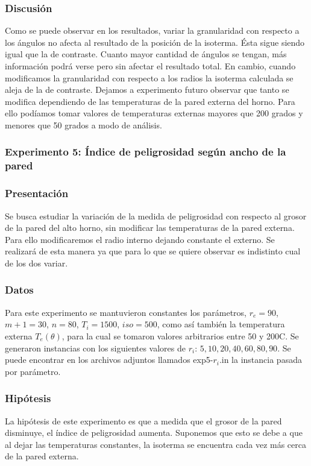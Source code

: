       \subsubsection*{Discusión}
        Como se puede observar en los resultados, variar la granularidad con respecto a los ángulos no afecta al resultado de la posición de la isoterma. Ésta sigue siendo igual que la de contraste. Cuanto mayor cantidad de ángulos se tengan, más información podrá verse pero sin afectar el resultado total. En cambio, cuando modificamos la granularidad con respecto a los radios la isoterma calculada se aleja de la de contraste. Dejamos a experimento futuro observar que tanto se modifica dependiendo de las temperaturas de la pared externa del horno. Para ello podíamos tomar valores de temperaturas externas mayores que 200 grados y menores que 50 grados a modo de análisis.


    \subsubsection*{Experimento 5: Índice de peligrosidad según ancho de la pared}

      \subsubsection*{Presentación}
        Se busca estudiar la variación de la medida de peligrosidad con respecto al grosor de la pared del alto horno, sin modificar las temperaturas de la pared externa. Para ello modificaremos el radio interno dejando constante el externo. Se realizará de esta manera ya que para lo que se quiere observar es indistinto cual de los dos variar. 

      \subsubsection*{Datos}
        Para este experimento se mantuvieron constantes los parámetros, $r_e = 90$, $m+1 = 30$, $n = 80$, $T_i = 1500$, $iso = 500$, como así también la temperatura externa $T_e(\theta)$, para la cual se tomaron valores arbitrarios entre 50 y 200{\degree}C. Se generaron instancias con los siguientes valores de $r_i$: $5, 10, 20, 40, 60, 80, 90$.  Se puede encontrar en los archivos adjuntos llamados exp5-$r_i$.in la instancia pasada por parámetro.
     
      \subsubsection*{Hipótesis}
        La hipótesis de este experimento es que a medida que el grosor de la pared disminuye, el índice de peligrosidad aumenta. Suponemos que esto se debe a que al dejar las temperaturas constantes, la isoterma se encuentra cada vez más cerca de la pared externa.
        
